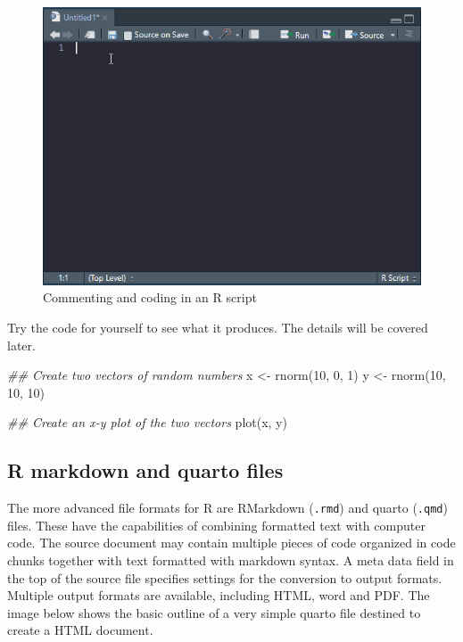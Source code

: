 \documentclass[
  11pt,
  letterpaper,
]{scrbook}
\newenvironment{Shaded}{\begin{snugshade}}{\end{snugshade}}
\newcommand{\DecValTok}[1]{\textcolor[rgb]{0.68,0.00,0.00}{#1}}
\newcommand{\DocumentationTok}[1]{\textcolor[rgb]{0.37,0.37,0.37}{\textit{#1}}}
\newcommand{\FunctionTok}[1]{\textcolor[rgb]{0.28,0.35,0.67}{#1}}
\newcommand{\NormalTok}[1]{\textcolor[rgb]{0.00,0.23,0.31}{#1}}
\newcommand{\OtherTok}[1]{\textcolor[rgb]{0.00,0.23,0.31}{#1}}
\begin{document}
\begin{figure}

{\centering \includegraphics{images/ch3/03-rscript.gif}

}

\caption{\label{fig-rscript}Commenting and coding in an R script}

\end{figure}

Try the code for yourself to see what it produces. The details will be
covered later.

\begin{Shaded}
\begin{Highlighting}[numbers=left,,]
\DocumentationTok{\#\# Create two vectors of random numbers}
\NormalTok{x }\OtherTok{\textless{}{-}} \FunctionTok{rnorm}\NormalTok{(}\DecValTok{10}\NormalTok{, }\DecValTok{0}\NormalTok{, }\DecValTok{1}\NormalTok{)}
\NormalTok{y }\OtherTok{\textless{}{-}} \FunctionTok{rnorm}\NormalTok{(}\DecValTok{10}\NormalTok{, }\DecValTok{10}\NormalTok{, }\DecValTok{10}\NormalTok{)}

\DocumentationTok{\#\# Create an x{-}y plot of the two vectors}
\FunctionTok{plot}\NormalTok{(x, y)}
\end{Highlighting}
\end{Shaded}

\hypertarget{r-markdown-and-quarto-files}{%
\subsection{R markdown and quarto
files}\label{r-markdown-and-quarto-files}}

The more advanced file formats for R are RMarkdown (\texttt{.rmd}) and
quarto (\texttt{.qmd}) files. These have the capabilities of combining
formatted text with computer code. The source document may contain
multiple pieces of code organized in code chunks together with text
formatted with markdown syntax. A meta data field in the top of the
source file specifies settings for the conversion to output formats.
Multiple output formats are available, including HTML, word and PDF. The
image below shows the basic outline of a very simple quarto file
destined to create a HTML document.
\end{document}
